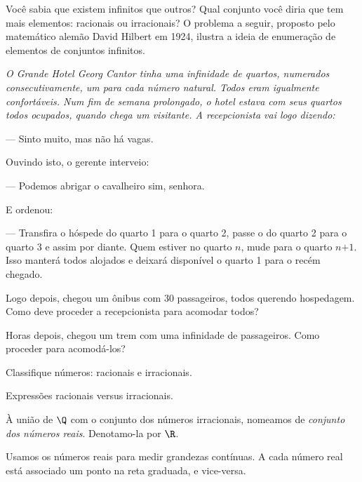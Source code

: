 {
	\noindent Você sabia que existem infinitos  que outros? Qual conjunto você diria que tem mais elementos: racionais ou irracionais? O problema a seguir, proposto pelo matemático alemão David Hilbert em 1924, ilustra a ideia de enumeração de elementos de conjuntos infinitos.

	{\itshape O Grande Hotel Georg Cantor tinha uma infinidade de quartos, numerados consecutivamente, um para cada número natural. Todos eram igualmente confortáveis. Num fim de semana prolongado, o hotel estava com seus quartos todos ocupados, quando chega um visitante. A recepcionista vai logo dizendo: 

	--- Sinto muito, mas não há vagas. 

	Ouvindo isto, o gerente interveio: 

	--- Podemos abrigar o cavalheiro sim, senhora. 

	E ordenou:

	--- Transfira o hóspede do quarto 1 para o quarto 2, passe o do quarto 2 para o quarto 3 e assim por diante. Quem estiver no quarto $n$, mude para o quarto $\textit{n+1}$. Isso manterá todos alojados e deixará disponível o quarto 1 para o recém chegado.

	Logo depois, chegou um ônibus com 30 passageiros, todos querendo hospedagem. Como deve proceder a recepcionista para acomodar todos? 

	Horas depois, chegou um trem com uma infinidade de passageiros. Como proceder para acomodá-los?}
}

\begin{onlineact}
	{Classifique números: racionais e irracionais}.
\end{onlineact}

\begin{onlineact}
	{Expressões racionais versus irracionais}.
\end{onlineact}

\begin{definition}
	À união de $\Q$ com o conjunto dos números irracionais, nomeamos de \emph{conjunto dos números reais}. Denotamo-la por $\R$.
\end{definition}

Usamos os números reais para medir grandezas contínuas. A cada número real está associado um ponto na reta graduada, e vice-versa. 

